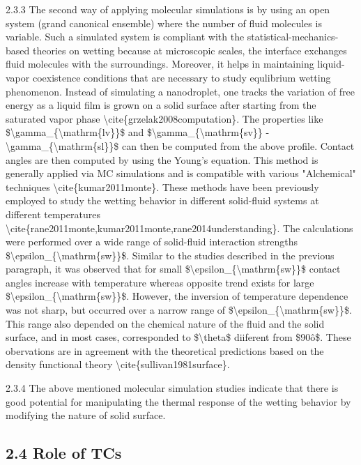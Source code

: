 \par 2.3.3 The second way of applying molecular simulations is by using an open system (grand canonical ensemble) where the number of fluid molecules is variable. Such a simulated system is compliant with the statistical-mechanics-based theories on wetting because at microscopic scales, the interface exchanges fluid molecules with the surroundings. Moreover, it helps in maintaining liquid-vapor coexistence conditions that are necessary to study equlibrium wetting phenomenon. Instead of simulating a nanodroplet, one tracks the variation of free energy as a liquid film is grown on a solid surface after starting from the saturated vapor phase \textbackslash cite\{grzelak2008computation\}. The properties like \$\textbackslash gamma\_\{\textbackslash mathrm\{lv\}\}\$ and \$\textbackslash gamma\_\{\textbackslash mathrm\{sv\}\} - \textbackslash gamma\_\{\textbackslash mathrm\{sl\}\}\$ can then be computed from the above profile. Contact angles are then computed by using the Young's equation. This method is generally applied via MC simulations and is compatible with various "Alchemical" techniques \textbackslash cite\{kumar2011monte\}. These methods have been previously employed to study the wetting behavior in different solid-fluid systems at different temperatures \textbackslash cite\{rane2011monte,kumar2011monte,rane2014understanding\}. The calculations were performed over a wide range of solid-fluid interaction strengths \$\textbackslash epsilon\_\{\textbackslash mathrm\{sw\}\}\$. Similar to the studies described in the previous paragraph, it was observed that for small \$\textbackslash epsilon\_\{\textbackslash mathrm\{sw\}\}\$ contact angles increase with temperature whereas opposite trend exists for large \$\textbackslash epsilon\_\{\textbackslash mathrm\{sw\}\}\$. However, the inversion of temperature dependence was not sharp, but occurred over a narrow range of \$\textbackslash epsilon\_\{\textbackslash mathrm\{sw\}\}\$. This range also depended on the chemical nature of the fluid and the solid surface, and in most cases, corresponded to \$\textbackslash theta\$ diiferent from \$90\^o\$. These obervations are in agreement with the theoretical predictions based on the density functional theory \textbackslash cite\{sullivan1981surface\}.
\par 2.3.4 The above mentioned molecular simulation studies indicate that there is good potential for manipulating the thermal response of the wetting behavior by modifying the nature of solid surface.\subsection{2.4 Role of TCs}

